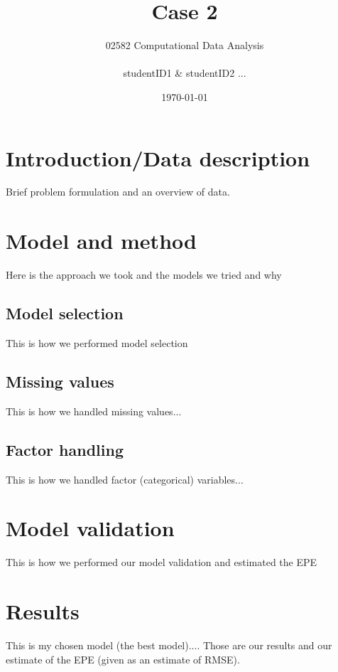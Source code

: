 \documentclass{article}
\title{Case 2}
\author{02582 Computational Data Analysis \\ \\ studentID1 \& studentID2 ...}
\date{\today}
\begin{document}
\maketitle
\section*{Introduction/Data description}
Brief problem formulation and an overview of data.
\section*{Model and method}
Here is the approach we took and the models we tried and why

\subsection*{Model selection}
This is how we performed model selection
\subsection*{Missing values}
This is how we handled missing values...
\subsection*{Factor handling}
This is how we handled factor (categorical) variables...

\section*{Model validation}
This is how we performed our model validation and estimated the EPE

\section*{Results}
This is my chosen model (the best model)....
Those are our results and our estimate of the EPE (given as
an estimate of RMSE).
\end{document}
